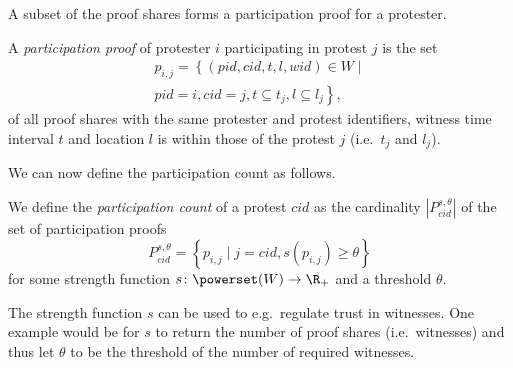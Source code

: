 A subset of the proof shares forms a participation proof for a protester.

\begin{definition}
  A \emph{participation proof} of protester \(i\) participating in protest \(j\) 
  is the set
  \begin{multline}
    \nonumber
    p_{i, j} =
    \left\{ (pid, cid, t, l, wid)\in W \mid \right. \\
    \left. pid = i, cid = j,
    t \subseteq t_j, l\subseteq l_j \right\},
  \end{multline}
  of all proof shares with the same protester and protest identifiers, witness 
  time interval \(t\) and location \(l\) is within those of the protest \(j\) 
  (i.e.\ \(t_j\) and \(l_j\)).
\end{definition}

We can now define the participation count as follows.
\begin{definition}
  We define the \emph{participation count} of a protest \(cid\) as the 
  cardinality \(|P_{cid}^{s,\theta}|\) of the set of participation proofs \[
    P_{cid}^{s,\theta} = \left\{ p_{i,j} \mid
      j = cid, s(p_{i,j})\geq \theta \right\}
  \] for some strength function \(s\colon \powerset(W)\to \R_+\) and a threshold 
  \(\theta\).
\end{definition}
The strength function \(s\) can be used to e.g.\ regulate trust in witnesses.
One example would be for \(s\) to return the number of proof shares (i.e.\ 
witnesses) and thus let \(\theta\) to be the threshold of the number of required 
witnesses.
